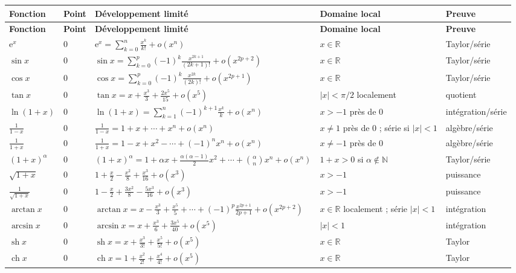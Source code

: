 \documentclass[11pt,a4paper]{article}
\newcommand{\R}{\mathbb{R}}
\newcommand{\N}{\mathbb{N}}
\newcommand{\e}{\mathrm{e}}
\DeclareMathOperator{\sh}{sh}
\DeclareMathOperator{\ch}{ch}
\begin{document}
\renewcommand{\arraystretch}{1.18}
{\footnotesize
\setlength{\tabcolsep}{2pt}
\begin{longtable}{>{\raggedright\arraybackslash}p{2.25cm}>{\raggedright\arraybackslash}p{1.0cm}>{\raggedright\arraybackslash}p{6.15cm}>{\raggedright\arraybackslash}p{2.85cm}>{\raggedright\arraybackslash}p{1.75cm}}
\toprule
\textbf{Fonction} & \textbf{Point} & \textbf{Développement limité} & \textbf{Domaine local} & \textbf{Preuve}\\
\midrule
\endfirsthead
\toprule
\textbf{Fonction} & \textbf{Point} & \textbf{Développement limité} & \textbf{Domaine local} & \textbf{Preuve}\\
\midrule
\endhead
$\e^x$ & $0$ & $\displaystyle \e^x=\sum_{k=0}^n\frac{x^k}{k!}+o(x^n)$ & $x\in\R$ & Taylor/série\\
$\sin x$ & $0$ & $\displaystyle \sin x=\sum_{k=0}^{p}(-1)^k\frac{x^{2k+1}}{(2k+1)!}+o(x^{2p+2})$ & $x\in\R$ & Taylor/série\\
$\cos x$ & $0$ & $\displaystyle \cos x=\sum_{k=0}^{p}(-1)^k\frac{x^{2k}}{(2k)!}+o(x^{2p+1})$ & $x\in\R$ & Taylor/série\\
$\tan x$ & $0$ & $\displaystyle \tan x=x+\frac{x^3}{3}+\frac{2x^5}{15}+o(x^5)$ & $|x|<\pi/2$ localement & quotient\\
$\ln(1+x)$ & $0$ & $\displaystyle \ln(1+x)=\sum_{k=1}^{n}(-1)^{k+1}\frac{x^k}{k}+o(x^n)$ & $x>-1$ près de $0$ & intégration/série\\
$\frac1{1-x}$ & $0$ & $\displaystyle \frac1{1-x}=1+x+\cdots+x^n+o(x^n)$ & $x\ne1$ près de $0$ ; série si $|x|<1$ & algèbre/série\\
$\frac1{1+x}$ & $0$ & $\displaystyle \frac1{1+x}=1-x+x^2-\cdots+(-1)^n x^n+o(x^n)$ & $x\ne-1$ près de $0$ & algèbre/série\\
$(1+x)^\alpha$ & $0$ & $\displaystyle (1+x)^\alpha=1+\alpha x+\frac{\alpha(\alpha-1)}{2}x^2+\cdots+\binom\alpha n x^n+o(x^n)$ & $1+x>0$ si $\alpha\notin\N$ & Taylor/série\\
$\sqrt{1+x}$ & $0$ & $\displaystyle 1+\frac{x}{2}-\frac{x^2}{8}+\frac{x^3}{16}+o(x^3)$ & $x>-1$ & puissance\\
$\frac1{\sqrt{1+x}}$ & $0$ & $\displaystyle 1-\frac{x}{2}+\frac{3x^2}{8}-\frac{5x^3}{16}+o(x^3)$ & $x>-1$ & puissance\\
$\arctan x$ & $0$ & $\displaystyle \arctan x=x-\frac{x^3}{3}+\frac{x^5}{5}+\cdots+(-1)^p\frac{x^{2p+1}}{2p+1}+o(x^{2p+2})$ & $x\in\R$ localement ; série $|x|<1$ & intégration\\
$\arcsin x$ & $0$ & $\displaystyle \arcsin x=x+\frac{x^3}{6}+\frac{3x^5}{40}+o(x^5)$ & $|x|<1$ & intégration\\
$\sh x$ & $0$ & $\displaystyle \sh x=x+\frac{x^3}{3!}+\frac{x^5}{5!}+o(x^5)$ & $x\in\R$ & Taylor\\
$\ch x$ & $0$ & $\displaystyle \ch x=1+\frac{x^2}{2!}+\frac{x^4}{4!}+o(x^5)$ & $x\in\R$ & Taylor\\
\bottomrule
\end{longtable}
}
\end{document}
